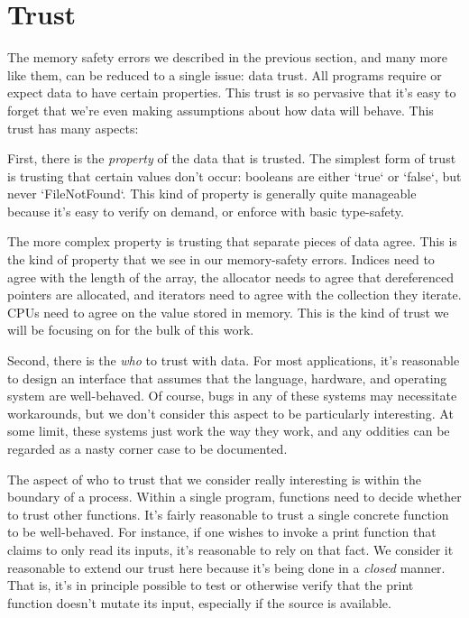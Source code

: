 \chapter{Trust}
\label{ch:trust}

The memory safety errors we described in the previous
section, and many more like them, can be reduced to a single issue: data trust.
All programs require or expect data to have certain properties. This trust
is so pervasive that it's easy to forget that we're even making assumptions about
how data will behave. This trust has many aspects:




First, there is the \emph{property} of the data that is trusted. The simplest form of
trust is trusting that certain values don't occur: booleans are either `true`
or `false`, but never `FileNotFound`. This kind of property is generally quite
manageable because it's easy to verify on demand, or enforce with basic type-safety.

The more complex property is trusting that separate pieces of data agree.
This is the kind of property that we see in our memory-safety errors. Indices need
to agree with the length of the array, the allocator needs to agree that
dereferenced pointers are allocated, and iterators need to agree with the collection
they iterate. CPUs need to agree on the value stored in memory. This is the kind of
trust we will be focusing on for the bulk of this work.




Second, there is the \emph{who} to trust with data. For most applications, it's
reasonable to design an interface that assumes that the language, hardware, and
operating system are well-behaved. Of course, bugs in any of these systems
may necessitate workarounds, but we don't consider this aspect to be particularly
interesting. At some limit, these systems just work the way they work, and any
oddities can be regarded as a nasty corner case to be documented.

The aspect of who to trust that we consider really interesting is within the
boundary of a process. Within a single program, functions need to decide whether
to trust other functions. It's fairly reasonable to trust a single concrete
function to be well-behaved. For instance, if one wishes to invoke a print
function that claims to only read its inputs, it's reasonable to rely on that
fact. We consider it reasonable to extend our trust here because it's being done
in a \emph{closed} manner. That is, it's in principle possible to test or otherwise
verify that the print function doesn't mutate its input, especially if the
source is available.

